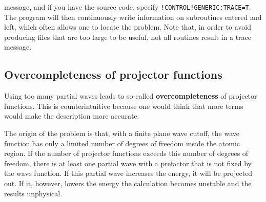 \documentclass[final,12pt]{article}
\begin{document}
{{{{{{\begin{enumerate}
  message, and if you have the source code, specify
  \verb|!CONTROL!GENERIC:TRACE=T|. The program will then
  continuously write information on subroutines entered and left,
  which often allows one to locate the problem. Note that, in order to
  avoid producing files that are too large to be useful, not all routines
  result in a trace message.   %
\end{enumerate}


\subsection{Overcompleteness of projector functions}
Using too many partial waves leads to so-called
\textbf{overcompleteness} of projector
functions.  This is counterintuitive because one would think that more
terms would make the description more accurate. 

The origin of the problem is that, with a finite plane wave cutoff,
the wave function has only a limited number of degrees of freedom
inside the atomic region. If the number of projector functions
exceeds this number of degrees of freedom, there is at least one
partial wave with a prefactor that is not fixed by the wave function.
If this partial wave increases the energy, it will be projected
out. If it, however, lowers the energy the calculation becomes
unstable and the results unphysical.

}}}}}}
\end{document}
